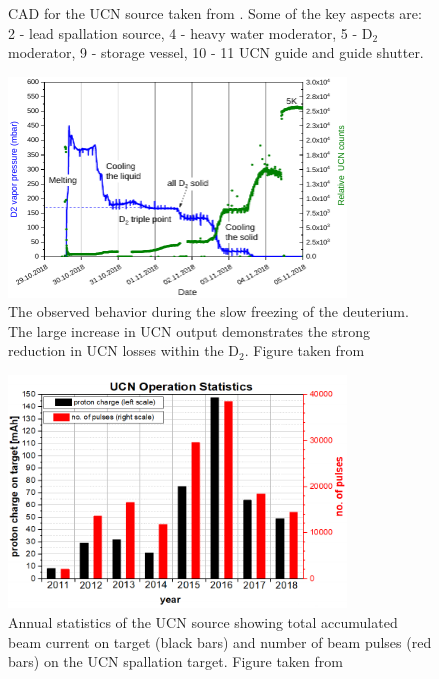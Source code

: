 \begin{refsection}
\begin{figure}
                \caption[UCN: source]{CAD for the UCN source taken from  \cite{PSI:review:2021}. Some of the key aspects are: 2 - lead spallation source, 4 - heavy water moderator, 5 - D$_2$ moderator, 9 - storage vessel, 10 - 11 UCN guide and guide shutter.}
                \label{fig:UCN_CAD}
            \end{figure}
            \begin{figure}
                \centering
                \includegraphics[width = 0.8\textwidth]{Figures/Introduction/UCN_behaviour.png}
                \caption[UCN: freezing behavior]{The observed behavior during the slow freezing of the deuterium. The large increase in UCN output demonstrates the strong reduction in UCN losses within the D$_2$. 
                Figure taken from \cite{PSI:review:2021}}
                \label{fig:UCN_behaviour}
            \end{figure}
            \begin{figure}
                \centering
                \includegraphics[width = 0.8\textwidth]{Figures/Introduction/UCN_stats.png}
                \caption[UCN: source statistics]{Annual statistics of the UCN source showing total accumulated beam current on target (black bars) and number of beam pulses (red bars) on the UCN spallation target. 
                Figure taken from \cite{PSI:review:2021}}
                \label{fig:UCN_stats}
            \end{figure}
            

\end{refsection}

